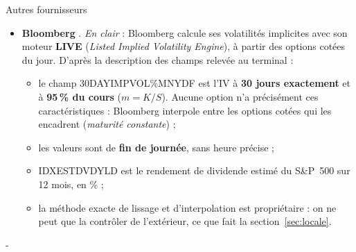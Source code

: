 \documentclass[10pt,a4paper]{article}
\makeatletter
\newcommand{\besoin}[1]{\par\penalty-100\begingroup\setlength{\dimen@}{#1}%
  \dimen@ii\pagegoal\advance\dimen@ii-\pagetotal
  \ifdim\dimen@>\dimen@ii\ifdim\dimen@ii>\z@\vfil\fi\break\fi\endgroup}
\newcommand{\coupure}{\textunderscore\allowbreak}
\newcommand{\fic}[1]{{\small\ttfamily\let\_\coupure #1}}
\makeatother
\begin{document}
\begin{fournisseur}{Autres fournisseurs}
\begin{itemize}
  En résumé, le skew mesure la \emph{forme} du sourire, le straddle sa \emph{hauteur} au centre.
  Ses données semblent relevées à 15\,h\,45 (suffixe « 1545 » des colonnes), sans que ce soit documenté.
\item \textbf{Bloomberg} \cite{bbg}. \emph{En clair} : Bloomberg calcule ses volatilités implicites avec son moteur \textbf{LIVE} (\emph{Listed Implied Volatility Engine}), à partir des options cotées du jour. D'après la description des champs relevée au terminal :
  \begin{itemize}
  \item le champ \fic{30DAY\_IMPVOL\_95.0\%MNY\_DF} est l'IV à \textbf{30 jours exactement} et à \textbf{95\,\% du cours} ($m=K/S$). Aucune option n'a précisément ces caractéristiques : Bloomberg interpole entre les options cotées qui les encadrent (\emph{maturité constante}) ;
  \item les valeurs sont de \textbf{fin de journée}, sans heure précise ;
  \item \fic{IDX\_EST\_DVD\_YLD} est le rendement de dividende estimé du S\&P~500 sur 12 mois, en \% ;
  \item la méthode exacte de lissage et d'interpolation est propriétaire : on ne peut que la contrôler de l'extérieur, ce que fait la section~\ref{sec:locale}.
  \end{itemize}
\end{itemize}
\end{fournisseur}

\besoin{17\baselineskip}%
\end{document}
